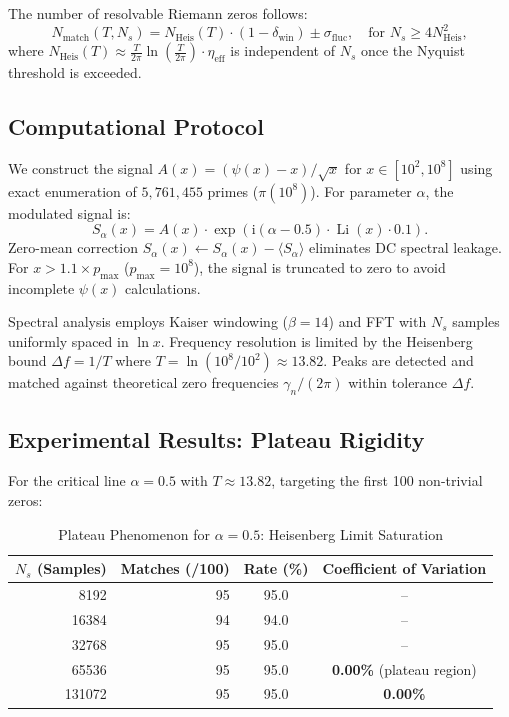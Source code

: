\documentclass[12pt,a4paper]{article}
\theoremstyle{definition}
\theoremstyle{plain}
\theoremstyle{remark}
\DeclareMathOperator{\Li}{Li}
\newcommand{\ii}{\mathrm{i}}
\begin{document}
The number of resolvable Riemann zeros follows:
\[
N_{\text{match}}(T, N_s) = N_{\text{Heis}}(T) \cdot (1 - \delta_{\text{win}}) \pm \sigma_{\text{fluc}}, \quad \text{for } N_s \geq 4N_{\text{Heis}}^2,
\]
where $N_{\text{Heis}}(T) \approx \frac{T}{2\pi}\ln\left(\frac{T}{2\pi}\right) \cdot \eta_{\text{eff}}$ is independent of $N_s$ once the Nyquist threshold is exceeded.

\subsection{Computational Protocol}
We construct the signal $A(x) = (\psi(x) - x)/\sqrt{x}$ for $x \in [10^2, 10^8]$ using exact enumeration of $5,761,455$ primes ($\pi(10^8)$). For parameter $\alpha$, the modulated signal is:
\[
S_\alpha(x) = A(x) \cdot \exp\left(\ii (\alpha - 0.5) \cdot \Li(x) \cdot 0.1\right).
\]
Zero-mean correction $S_\alpha(x) \leftarrow S_\alpha(x) - \langle S_\alpha \rangle$ eliminates DC spectral leakage. For $x > 1.1 \times p_{\max}$ ($p_{\max} = 10^8$), the signal is truncated to zero to avoid incomplete $\psi(x)$ calculations.

Spectral analysis employs Kaiser windowing ($\beta = 14$) and FFT with $N_s$ samples uniformly spaced in $\ln x$. Frequency resolution is limited by the Heisenberg bound $\Delta f = 1/T$ where $T = \ln(10^8/10^2) \approx 13.82$. Peaks are detected and matched against theoretical zero frequencies $\gamma_n/(2\pi)$ within tolerance $\Delta f$.

\subsection{Experimental Results: Plateau Rigidity}
For the critical line $\alpha = 0.5$ with $T \approx 13.82$, targeting the first 100 non-trivial zeros:

\begin{table}[h]
\centering
\caption{Plateau Phenomenon for $\alpha = 0.5$: Heisenberg Limit Saturation}
\begin{tabular}{@{}rrcc@{}} \toprule
$N_s$ (Samples) & Matches (/100) & Rate (\%) & Coefficient of Variation \\ \midrule
8192   & 95 & 95.0 & -- \\
16384  & 94 & 94.0 & -- \\
32768  & 95 & 95.0 & -- \\
65536  & 95 & 95.0 & \textbf{0.00\%} (plateau region) \\
131072 & 95 & 95.0 & \textbf{0.00\%} \\ \bottomrule
\end{tabular}
\end{table}
\end{document}

